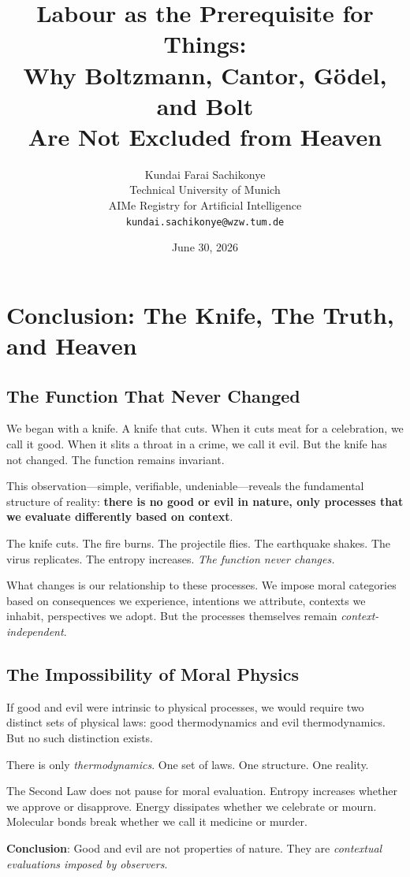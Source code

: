 \documentclass[11pt,a4paper]{article}
\title{\textbf{Labour as the Prerequisite for Things:\\[3pt]
Why Boltzmann, Cantor, Gödel, and Bolt\\
Are Not Excluded from Heaven}}
\author{%
Kundai Farai Sachikonye\\
\small Technical University of Munich\\
\small AIMe Registry for Artificial Intelligence\\
\small \texttt{kundai.sachikonye@wzw.tum.de}}
\date{June 30, 2026}
\begin{document}
\section{Conclusion: The Knife, The Truth, and Heaven}
\label{sec:conclusion}

\subsection{The Function That Never Changed}

We began with a knife. A knife that cuts. When it cuts meat for a celebration, 
we call it good. When it slits a throat in a crime, we call it evil. But the 
knife has not changed. The function remains invariant.

This observation—simple, verifiable, undeniable—reveals the fundamental 
structure of reality: \textbf{there is no good or evil in nature, only 
processes that we evaluate differently based on context}.

The knife cuts. The fire burns. The projectile flies. The earthquake shakes. 
The virus replicates. The entropy increases. \emph{The function never changes.}

What changes is our relationship to these processes. We impose moral categories 
based on consequences we experience, intentions we attribute, contexts we 
inhabit, perspectives we adopt. But the processes themselves remain 
\emph{context-independent}.

\subsection{The Impossibility of Moral Physics}

If good and evil were intrinsic to physical processes, we would require two 
distinct sets of physical laws: good thermodynamics and evil thermodynamics. 
But no such distinction exists.

There is only \emph{thermodynamics}. One set of laws. One structure. One 
reality.

The Second Law does not pause for moral evaluation. Entropy increases whether 
we approve or disapprove. Energy dissipates whether we celebrate or mourn. 
Molecular bonds break whether we call it medicine or murder.

\textbf{Conclusion}: Good and evil are not properties of nature. They are 
\emph{contextual evaluations imposed by observers}.
\end{document}
